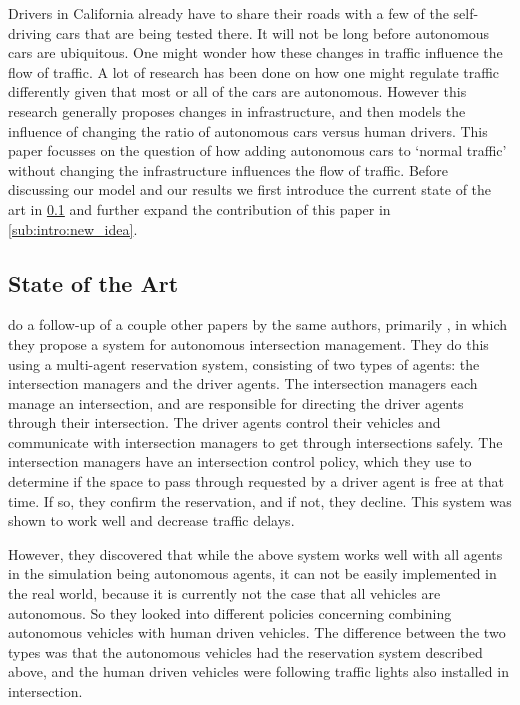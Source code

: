 Drivers in California already have to share their roads with a few of the self-driving cars that are being tested there. It will not be long before autonomous cars are ubiquitous. One might wonder how these changes in traffic influence the flow of traffic. A lot of research has been done on how one might regulate traffic differently given that most or all of the cars are autonomous. However this research generally proposes changes in infrastructure, and then models the influence of changing the ratio of autonomous cars versus human drivers. This paper focusses on the question of how adding autonomous cars to `normal traffic' without changing the infrastructure influences the flow of traffic. Before discussing our model and our results we first introduce the current state of the art in \cref{sub:intro:state_of_the_art} and further expand the contribution of this paper in \cref{sub:intro:new_idea}.

\subsection{State of the Art}
\label{sub:intro:state_of_the_art}


\textcite{dresner2007sharing} do a follow-up of a couple other papers by the same authors, primarily \textcite{dresner2005traffic}, in which they propose a system for autonomous intersection management. They do this using a multi-agent reservation system, consisting of two types of agents: the intersection managers and the driver agents. The intersection managers each manage an intersection, and are responsible for directing the driver agents through their intersection. The driver agents control their vehicles and communicate with intersection managers to get through intersections safely. The intersection managers have an intersection control policy, which they use to determine if the space to pass through requested by a driver agent is free at that time. If so, they confirm the reservation, and if not, they decline. This system was shown to work well and decrease traffic delays. 

However, they discovered that while the above system works well with all agents in the simulation being autonomous agents, it can not be easily implemented in the real world, because it is currently not the case that all vehicles are autonomous. So they looked into different policies concerning combining autonomous vehicles with human driven vehicles. The difference between the two types was that the autonomous vehicles had the reservation system described above, and the human driven vehicles were following traffic lights also installed in intersection. 

